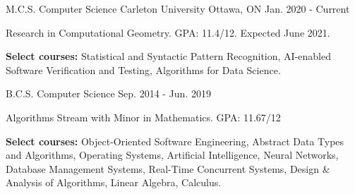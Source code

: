 \begin{cventries}

\educationentry
{M.C.S. Computer Science}
{Carleton University}
{Ottawa, ON}
{Jan. 2020 - Current}
{\begin{cvitems}
    \item {Research in Computational Geometry. GPA: 11.4/12. Expected June 2021.}
    \item {\textbf{Select courses:} Statistical and Syntactic Pattern Recognition, AI-enabled Software Verification and Testing, Algorithms for Data Science.}
\end{cvitems}}
{B.C.S. Computer Science}
{Sep. 2014 - Jun. 2019}
{\begin{cvitems}
    \item {Algorithms Stream with Minor in Mathematics. GPA: 11.67/12}
    \item {\textbf{Select courses:} Object-Oriented Software Engineering, Abstract Data Types and Algorithms, Operating Systems, Artificial Intelligence, Neural Networks, Database Management Systems, Real-Time Concurrent Systems, Design \& Analysis of Algorithms, Linear Algebra, Calculus.}
\end{cvitems}}

\end{cventries}
